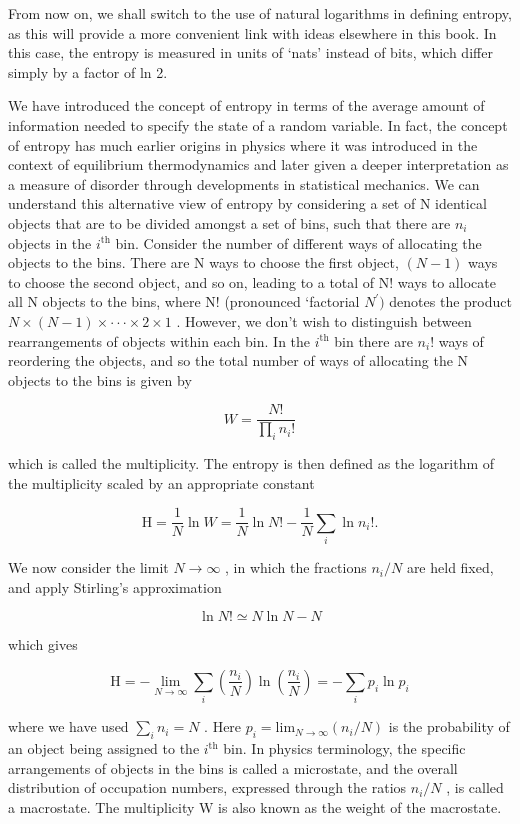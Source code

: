 \documentclass[
  10
]{article}
\begin{document}
From now on, we shall switch to the use of natural logarithms in
defining entropy, as this will provide a more convenient link with ideas
elsewhere in this book. In this case, the entropy is measured in units
of `nats' instead of bits, which differ simply by a factor of ln 2.

We have introduced the concept of entropy in terms of the average amount
of information needed to specify the state of a random variable. In
fact, the concept of entropy has much earlier origins in physics where
it was introduced in the context of equilibrium thermodynamics and later
given a deeper interpretation as a measure of disorder through
developments in statistical mechanics. We can understand this
alternative view of entropy by considering a set of N identical objects
that are to be divided amongst a set of bins, such that there are
\(n _ { i }\) objects in the \(i ^ { \mathrm { t h } }\) bin. Consider
the number of different ways of allocating the objects to the bins.
There are N ways to choose the first object, \(( N - 1 )\) ways to
choose the second object, and so on, leading to a total of N! ways to
allocate all N objects to the bins, where N! (pronounced `factorial
\(N ^ { \prime } )\) denotes the product
\(N \times ( N - 1 ) \times \cdot \cdot \cdot \times 2 \times 1\) .
However, we don't wish to distinguish between rearrangements of objects
within each bin. In the \(i ^ { \mathrm { t h } }\) bin there are
\(n _ { i } !\) ways of reordering the objects, and so the total number
of ways of allocating the N objects to the bins is given by

\[
W = \frac {N !}{\prod_ {i} n _ {i} !}\tag{1.94}
\]

which is called the multiplicity. The entropy is then defined as the
logarithm of the multiplicity scaled by an appropriate constant

\[
\mathrm{H} = \frac {1}{N} \ln W = \frac {1}{N} \ln N! - \frac {1}{N} \sum_ {i} \ln n _ {i}!.\tag{1.95}
\]

We now consider the limit \(N \to \infty\) , in which the fractions
\(n _ { i } / N\) are held fixed, and apply Stirling's approximation

\[
\ln N! \simeq N \ln N - N\tag{1.96}
\]

which gives

\[
\mathrm{H} = - \lim _ {N \to \infty} \sum_ {i} \left(\frac {n _ {i}}{N}\right) \ln \left(\frac {n _ {i}}{N}\right) = - \sum_ {i} p _ {i} \ln p _ {i}\tag{1.97}
\]

where we have used \(\textstyle \sum _ { i } n _ { i } = N\) . Here
\(p _ { i } = \mathrm { l i m } _ { N \to \infty } ( n _ { i } / N )\)
is the probability of an object being assigned to the
\(i ^ { \mathrm { t h } }\) bin. In physics terminology, the specific
arrangements of objects in the bins is called a microstate, and the
overall distribution of occupation numbers, expressed through the ratios
\(n _ { i } / N\) , is called a macrostate. The multiplicity W is also
known as the weight of the macrostate.
\end{document}
